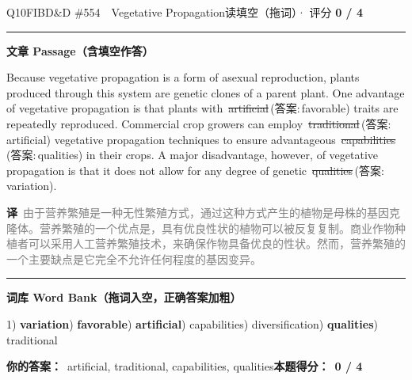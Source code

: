 \documentclass[11pt]{article}
\newcommand{\ptesub}[1]{%
  \par\needspace{2\baselineskip}\smallskip
  {\color{cAccent}\rule[-0.2ex]{3pt}{1.05em}}\hspace{6pt}%
  {\bfseries\color{cHead}#1}\par\nopagebreak\smallskip}
\newcommand{\zh}[1]{{\footnotesize\textcolor{cNote}{\textbf{译}}\ \textcolor{gray}{#1}}}
\newcommand{\rno}[2]{{\color{cWrong}\ding{55}\,\sout{#1}}\,{\footnotesize\color{cFix}(答案:\,#2)}}  %
\begin{document}
\begin{qblock}{Q10\quad FIBD\&D \#554\ \ Vegetative Propagation}{读填空（拖词）· 评分 \textcolor{cAccent}{\bfseries 0 / 4}}
\ptesub{文章 Passage（含填空作答）}
\begin{promptbox}
Because vegetative propagation is a form of asexual reproduction, plants produced through this system are genetic clones of a parent plant. One advantage of vegetative propagation is that plants with \rno{artificial}{favorable} traits are repeatedly reproduced. Commercial crop growers can employ \rno{traditional}{artificial} vegetative propagation techniques to ensure advantageous \rno{capabilities}{qualities} in their crops. A major disadvantage, however, of vegetative propagation is that it does not allow for any degree of genetic \rno{qualities}{variation}.
\end{promptbox}
\zh{由于营养繁殖是一种无性繁殖方式，通过这种方式产生的植物是母株的基因克隆体。营养繁殖的一个优点是，具有优良性状的植物可以被反复复制。商业作物种植者可以采用人工营养繁殖技术，来确保作物具备优良的性状。然而，营养繁殖的一个主要缺点是它完全不允许任何程度的基因变异。}
\ptesub{词库 Word Bank（拖词入空，正确答案加粗）}
{\small 1) \textbf{variation}) \textbf{favorable}) \textbf{artificial}) capabilities) diversification) \textbf{qualities}) traditional}
\par\smallskip
\textbf{你的答案：}\ {\color{cWrong}artificial, traditional, capabilities, qualities}\qquad\textbf{本题得分：}\ {\color{cAccent}\bfseries 0 / 4}
\end{qblock}
\end{document}
